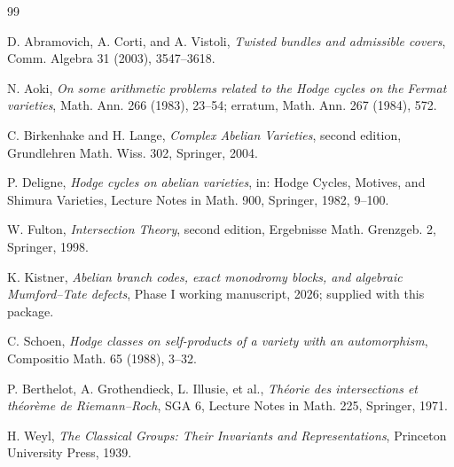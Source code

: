 \documentclass[11pt]{article}
\theoremstyle{definition}
\theoremstyle{remark}
\begin{document}
\begin{thebibliography}{99}

D. Abramovich, A. Corti, and A. Vistoli,
\emph{Twisted bundles and admissible covers},
Comm. Algebra 31 (2003), 3547--3618.

N. Aoki,
\emph{On some arithmetic problems related to the Hodge cycles on the Fermat varieties},
Math. Ann. 266 (1983), 23--54;
erratum, Math. Ann. 267 (1984), 572.

C. Birkenhake and H. Lange,
\emph{Complex Abelian Varieties}, second edition,
Grundlehren Math. Wiss. 302, Springer, 2004.

P. Deligne,
\emph{Hodge cycles on abelian varieties},
in: Hodge Cycles, Motives, and Shimura Varieties,
Lecture Notes in Math. 900, Springer, 1982, 9--100.

W. Fulton,
\emph{Intersection Theory}, second edition,
Ergebnisse Math. Grenzgeb. 2, Springer, 1998.

K. Kistner,
\emph{Abelian branch codes, exact monodromy blocks, and algebraic Mumford--Tate defects},
Phase I working manuscript, 2026; supplied with this package.

C. Schoen,
\emph{Hodge classes on self-products of a variety with an automorphism},
Compositio Math. 65 (1988), 3--32.

P. Berthelot, A. Grothendieck, L. Illusie, et al.,
\emph{Th\'eorie des intersections et th\'eor\`eme de Riemann--Roch},
SGA 6, Lecture Notes in Math. 225, Springer, 1971.

H. Weyl,
\emph{The Classical Groups: Their Invariants and Representations},
Princeton University Press, 1939.

\end{thebibliography}
\end{document}
